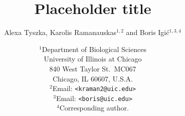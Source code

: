 \documentclass[11pt,letterpaper,titlepage]{article}
\begin{document}
\title{\Large\bf{Placeholder title}}
\author{Alexa Tyszka, Karolis Ramanauskas$^{1,2}$ and Boris Igi\'{c}$^{1,3,4}$}
\date{
    $^1$Department of Biological Sciences\\
    University of Illinois at Chicago\\
    840 West Taylor St.\ MC067\\
    Chicago, IL 60607, U.S.A.\\
    [\baselineskip]
    $^2$Email: {\tt<kraman2@uic.edu>}\\
    $^3$Email: {\tt<boris@uic.edu>}\\
    $^4$Corresponding author.\\
}
\maketitle




\end{document}
